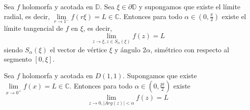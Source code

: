 \begin{theorem}
    Sea $f$ holomorfa y acotada en $\mathbb{D}$.
    Sea $\xi \in \partial \mathbb{D}$ y supongamos que existe el límite radial, es decir, $\lim\limits_{r \to 1^-} f(r\xi) = L \in \mathbb{C}$.
    Entonces para todo $\alpha \in (0, \frac{\pi}{2})$ existe el límite tangencial de $f$ en $\xi$, es decir,
    $$\lim\limits_{z \to \xi, z \in S_\alpha(\xi)} f(z) = L$$
    siendo $S_\alpha(\xi)$ el vector de vértice $\xi$ y ángulo $2\alpha$, simétrico con respecto al segmento $[0, \xi]$.
\end{theorem}

\begin{theorem}
    Sea $f$ holomorfa y acotada en $D(1, 1)$.
    Supongamos que existe $\lim\limits_{x \to 0^+} f(x) = L \in \mathbb{C}$.
    Entonces para todo $\alpha \in (0, \frac{pi}{2})$ existe
    $$\lim\limits_{z \to 0, |Arg(z)| < \alpha} f(z) = L$$
\end{theorem}

